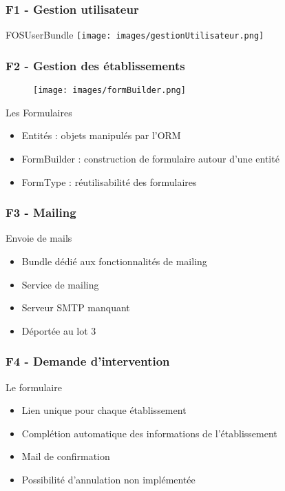 \speaker{\Florian}

\begin{frame}
\frametitle{F1 - Gestion utilisateur}
\begin{block}{FOSUserBundle}
	\texttt{[image: images/gestionUtilisateur.png]}
\end{block}
\end{frame}

\begin{frame}
\frametitle{F2 - Gestion des établissements}
\begin{minipage}[c]{.3\linewidth}
      \begin{figure}[r]
		\texttt{[image: images/formBuilder.png]}
	  \end{figure}
   \end{minipage} \hfill
   \begin{minipage}[c]{.4\linewidth}
      \begin{block}{Les Formulaires}
		\begin{itemize}
			\item Entités : objets manipulés par l'ORM 
			\item FormBuilder : construction de formulaire autour d'une entité
			\item FormType : réutilisabilité des formulaires
		\end{itemize}
	  \end{block}
   \end{minipage} \hfill
\end{frame}

\begin{frame}
\frametitle{F3 - Mailing}
\begin{block}{Envoie de mails}
	\begin{itemize}
		\item Bundle dédié aux fonctionnalités de mailing
		\item Service de mailing
		\item Serveur SMTP manquant
		\item Déportée au lot 3
	\end{itemize}
\end{block}
\end{frame}

\begin{frame}
\frametitle{F4 - Demande d'intervention}
\begin{block}{Le formulaire}
	\begin{itemize}
		\item Lien unique pour chaque établissement
		\item Complétion automatique des informations de l'établissement
		\item Mail de confirmation
		\item Possibilité d'annulation non implémentée
	\end{itemize}
\end{block}
\end{frame}